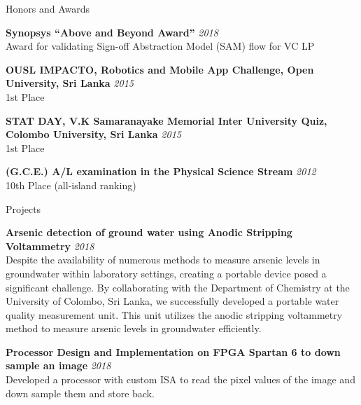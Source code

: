 \documentclass[
11pt, %
]{./assets/resume} %
\begin{document}


\begin{rSection}{Honors and Awards}

	\textbf{Synopsys “Above and Beyond Award”} \hfill \textit{2018}\\
	Award for validating Sign-off Abstraction Model (SAM) flow for VC LP

	\textbf{OUSL IMPACTO, Robotics and Mobile App Challenge, Open University, Sri Lanka} \hfill \textit{2015}\\
	1st Place

	\textbf{STAT DAY, V.K Samaranayake Memorial Inter University Quiz, Colombo University, Sri Lanka} \hfill \textit{2015}\\
	1st Place

	\textbf{(G.C.E.) A/L examination in the Physical Science Stream} \hfill \textit{2012}\\
	10th Place (all-island ranking)

\end{rSection}

\begin{rSection}{Projects}

	\textbf{Arsenic detection of ground water using Anodic Stripping Voltammetry} \hfill \textit{2018}\\
	Despite the availability of numerous methods to measure arsenic levels in groundwater within laboratory settings, creating a portable device posed a significant challenge. By collaborating with the Department of Chemistry at the University of Colombo, Sri Lanka, we successfully developed a portable water quality measurement unit. This unit utilizes the anodic stripping voltammetry method to measure arsenic levels in groundwater efficiently. 

	\textbf{Processor Design and Implementation on FPGA Spartan 6 to down sample an image} \hfill \textit{2018}\\
	Developed a processor with custom ISA to read the pixel values of the image and down sample them and store back.  

\end{rSection}
\end{document}
